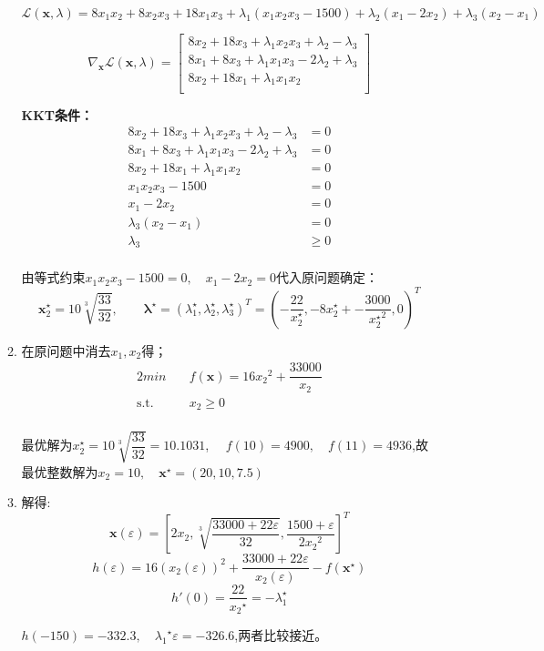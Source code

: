 \documentclass[UTF8]{ctexart}
\begin{document}
\begin{enumerate}
\begin{enumerate}
\[\mathcal{L}(\bm{x},\lambda)=8{x_1}{x_2} + 8{x_2}{x_3} + 18{x_1}{x_3} + {\lambda _1}\left( {{x_1}{x_2}{x_3} - 1500} \right) + {\lambda _2}\left( {{x_1} - 2{x_2}}\right)+{\lambda _3}\left( {{x_2} - {x_1}} \right)\]

\[\nabla_{\bm{x}}\mathcal{L}(\bm{x},\lambda)=\begin{bmatrix}
8{x_2} + 18{x_3} + {\lambda _1}{x_2}{x_3} + {\lambda _2}- {\lambda _3}\\
8{x_1} +8{x_3} + {\lambda _1}{x_1}{x_3} - 2{\lambda _2}+{\lambda _3}\\
8{x_2} + 18{x_1} + {\lambda _1}{x_1}{x_2}\\
\end{bmatrix}\]


\textbf{KKT条件：}
\begin{align}
8{x_2} + 18{x_3} + {\lambda _1}{x_2}{x_3} + {\lambda _2}- {\lambda _3}&=0\nonumber\\
8{x_1} +8{x_3} + {\lambda _1}{x_1}{x_3} - 2{\lambda _2}+{\lambda _3}&=0\nonumber\\
8{x_2} + 18{x_1} + {\lambda _1}{x_1}{x_2}&=0\nonumber\\
{x_1}{x_2}{x_3} - 1500&=0\nonumber\\
{x_1} - 2{x_2}&=0\nonumber\\
{\lambda _3}( {{x_2} - {x_1}})&=0\nonumber\\
{\lambda _3}&\geq 0\nonumber\\
\end{align}

由等式约束${x_1}{x_2}{x_3} - 1500=0,\quad {x_1} - 2{x_2}=0$代入原问题确定：
\[\bm{x}_2^{\star}=10\sqrt[3]{\dfrac{33}{32}},\qquad \bm{\lambda}^{\star}=(\lambda_1^{\star},\lambda_2^{\star},\lambda_3^{\star})^T=(-\dfrac{22}{x_2^{\star}},-8x_2^{\star}+-\dfrac{3000}{{x_2^{\star}}^2},0)^T\]

\item
在原问题中消去$x_1,x_2$得；
\begin{alignat}{2}
min \quad & f(\bm{x})=16{x_2}^2+\dfrac{33000}{x_2} \nonumber\\
\mbox{s.t.}\quad
&x_2\geq 0 \nonumber\\
\end{alignat}

最优解为$x_2^{\star}=10\sqrt[3]{\dfrac{33}{32}}=10.1031$,
$\quad f(10)=4900,\quad f(11)=4936$,故最优整数解为$x_2=10,\quad \bm{x}^{\star}=(20,10,7.5)$

\item
解得:
\[\bm{x}(\varepsilon )=\left[
2x_2,
\sqrt[3]{{\frac{{33000 + 22\varepsilon }}{{32}}}},
\frac{{1500 + \varepsilon }}{{2{x_2}^2}}\right]^T\]
\[h(\varepsilon ) = 16{({x_{2}}(\varepsilon ))^2} + \frac{{33000 + 22\varepsilon }}{{{x_{ 2}}(\varepsilon )}}-f(\bm{x}^{\star})\]
\[h'(0) = \dfrac{{22}}{{{x_2}^{\star}}}=-\lambda_1^{\star}\]

$h(-150)=-332.3,\quad {\lambda_1}^{\star}\varepsilon =-326.6$,两者比较接近。
\end{enumerate}
\end{enumerate}
\end{document}

